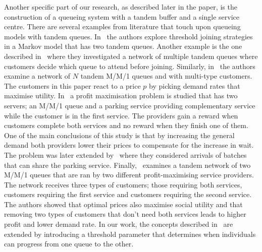 Another specific part of our research, as described later in the paper, is the 
construction of a queueing system with a tandem buffer and a single service
centre.
There are several examples from literature that touch upon queueing models
with tandem queues.
In~\cite{d2015pure} the authors explore threshold joining strategies in a 
Markov model that has two tandem queues.
Another example is the one described in~\cite{burnetas2013customer}
where they investigated a network of multiple tandem queues where customers 
decide which queue to attend before joining.
Similarly, in~\cite{bacsar2002stackelberg} the authors examine a network of 
\(N\) tandem M/M/1 queues and with multi-type customers. 
The customers in this paper react to a price \(p\) by picking demand rates that 
maximise utility.
In~\cite{veltman2005equilibrium} a profit maximisation problem is studied that
has two servers; an M/M/1 queue and a parking service providing complementary 
service while the customer is in the first service. 
The providers gain a reward when customers complete both services and no reward 
when they finish one of them.
One of the main conclusions of this study is that by increasing the general 
demand both providers lower their prices to compensate for the increase in wait.
The problem was later extended by~\cite{sun2009equilibrium} where they 
considered arrivals of batches that can share the parking service.
Finally,~\cite{afeche2007decentralized} examines a tandem network of two M/M/1 
queues that are ran by two different profit-maximising service providers.
The network receives three types of customers; those requiring both services, 
customers requiring the first service and customers requiring the second
service.
The authors showed that optimal prices also maximise social utility and that
removing two types of customers that don't need both services leads to higher 
profit and lower demand rate.
In our work, the concepts described in~\cite{d2015pure, burnetas2013customer,
bacsar2002stackelberg} are extended by introducing a threshold parameter that 
determines when individuals can progress from one queue to the other.

